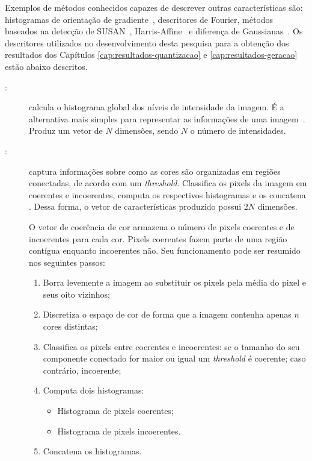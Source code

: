 Exemplos de métodos conhecidos capazes de descrever outras características são: histogramas de orientação de gradiente~\cite{Wang2009}, descritores de Fourier, métodos baseados na detecção de SUSAN~\cite{Smith1997}, Harris-Affine~\cite{Han2005b} e diferença de Gaussianas~\cite{Lowe2004a}. Os descritores utilizados no desenvolvimento desta pesquisa para a obtenção dos resultados dos Capítulos \ref{cap:resultados-quantizacao} e \ref{cap:resultados-geracao} estão abaixo descritos.

\begin{description}
\item[:] calcula o histograma global dos níveis de intensidade da imagem. É a alternativa mais simples para representar as informações de uma imagem~\cite{Gonzalez2007}. Produz um vetor de $N$ dimensões, sendo $N$ o número de intensidades.

\item[:] captura informações sobre como as cores são organizadas em regiões conectadas, de acordo com um \textit{threshold}. Classifica os pixels da imagem em coerentes e incoerentes, computa os respectivos histogramas e os concatena \cite{ccv}. Dessa forma, o vetor de características produzido possui $2N$ dimensões.

O vetor de coerência de cor armazena o número de pixels coerentes e de incoerentes para cada cor. Pixels coerentes fazem parte de uma região contígua enquanto incoerentes não. Seu funcionamento pode ser resumido nos seguintes passos:

\begin{enumerate}
  \item Borra levemente a imagem ao substituir os pixels pela média do pixel e seus oito vizinhos;
  \item Discretiza o espaço de cor de forma que a imagem contenha apenas $n$ cores distintas;
  \item Classifica os pixels entre coerentes e incoerentes: se o tamanho do seu componente conectado for maior ou igual um \textit{threshold} é coerente; caso contrário, incoerente;
  \item Computa dois histogramas:
  \begin{itemize}
    \item Histograma de pixels coerentes;
    \item Histograma de pixels incoerentes.
  \end{itemize}
  \item Concatena os histogramas.
\end{enumerate}


\end{description}
